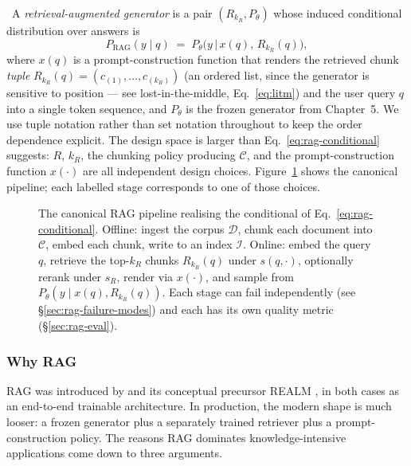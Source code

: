 \Def\ A \emph{retrieval-augmented generator} is a pair $(R_{k_R},
P_\theta)$ whose induced conditional distribution over answers is
\begin{equation}
  P_{\mathrm{RAG}}(y \mid q)
  \;=\; P_\theta\bigl(y \,\big|\, x(q), \, R_{k_R}(q)\bigr),
  \label{eq:rag-conditional}
\end{equation}
where $x(q)$ is a prompt-construction function that renders the
retrieved chunk \emph{tuple} $R_{k_R}(q) = (c_{(1)}, \dots, c_{(k_R)})$
(an ordered list, since the generator is sensitive to position
--- see lost-in-the-middle, Eq.~\eqref{eq:litm}) and the user
query $q$ into a single token sequence, and $P_\theta$ is the
frozen generator from Chapter~5. We use tuple notation rather than
set notation throughout to keep the order dependence explicit. The design space is
larger than Eq.~\eqref{eq:rag-conditional} suggests: $R$, $k_R$, the
chunking policy producing $\mathcal{C}$, and the prompt-construction
function $x(\cdot)$ are all independent design choices.
Figure~\ref{fig:rag-pipeline} shows the canonical pipeline; each
labelled stage corresponds to one of those choices.

\begin{figure}[ht]
  \centering
  
  \caption{The canonical RAG pipeline realising the conditional of
  Eq.~\eqref{eq:rag-conditional}. Offline: ingest the corpus
  $\mathcal{D}$, chunk each document into $\mathcal{C}$, embed each chunk,
  write to an index $\mathcal{I}$. Online: embed the query $q$, retrieve
  the top-$k_R$ chunks $R_{k_R}(q)$ under $s(q, \cdot)$, optionally
  rerank under $s_R$, render via $x(\cdot)$, and sample from
  $P_\theta(y \mid x(q), R_{k_R}(q))$. Each stage can fail
  independently (see \S\ref{sec:rag-failure-modes}) and each has its
  own quality metric (\S\ref{sec:rag-eval}).}
  \label{fig:rag-pipeline}
\end{figure}

\subsubsection{Why RAG}

RAG was introduced by \citet{lewis2020retrieval} and its conceptual
precursor REALM \citep{guu2020realm}, in both cases as an end-to-end
trainable architecture. In production, the modern shape is much
looser: a frozen generator plus a separately trained retriever
plus a prompt-construction policy. The reasons RAG dominates
knowledge-intensive applications come down to three arguments.

